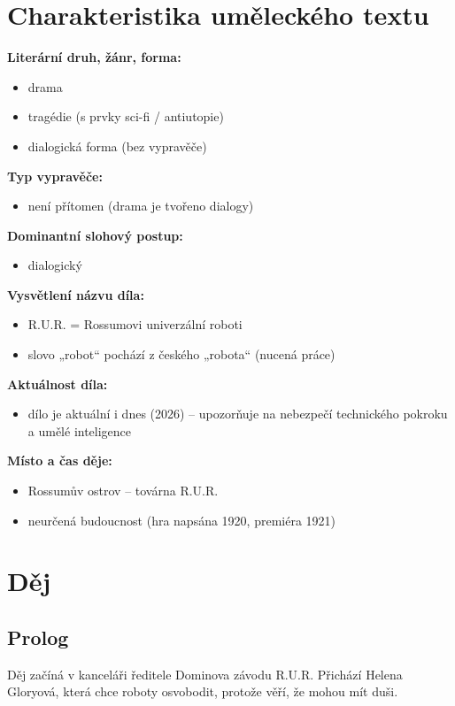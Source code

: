 \documentclass[12pt,a4paper]{article}
\begin{document}
\section*{Charakteristika uměleckého textu}

\begin{tcolorbox}[breakable]

\textbf{Literární druh, žánr, forma:}
\begin{itemize}
	\item drama
	\item tragédie (s prvky sci-fi / antiutopie)
	\item dialogická forma (bez vypravěče)
\end{itemize}

\textbf{Typ vypravěče:}
\begin{itemize}
\item není přítomen (drama je tvořeno dialogy)
\end{itemize}

\textbf{Dominantní slohový postup:}
\begin{itemize}
\item dialogický
\end{itemize}

\textbf{Vysvětlení názvu díla:}
\begin{itemize}
\item R.U.R. = Rossumovi univerzální roboti
\item slovo „robot“ pochází z českého „robota“ (nucená práce)
\end{itemize}

\textbf{Aktuálnost díla:}
\begin{itemize}
\item dílo je aktuální i dnes (2026) – upozorňuje na nebezpečí technického pokroku a umělé inteligence
\end{itemize}

\textbf{Místo a čas děje:}
\begin{itemize}
\item Rossumův ostrov – továrna R.U.R.
\item neurčená budoucnost (hra napsána 1920, premiéra 1921)
\end{itemize}

\section*{Děj}

\subsection*{Prolog}
Děj začíná v kanceláři ředitele Dominova závodu R.U.R. Přichází Helena Gloryová, která chce roboty osvobodit, protože věří, že mohou mít duši.


\end{tcolorbox}
\end{document}
